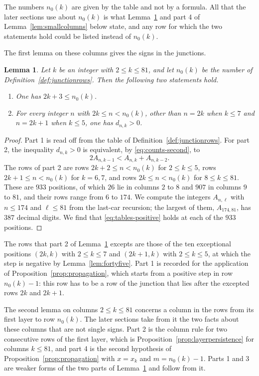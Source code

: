 \documentclass{amsart}
\newtheorem{lemma}[theorem]{Lemma}
\theoremstyle{definition}
\theoremstyle{remark}
\numberwithin{equation}{section}
\begin{document}
The numbers $n_0(k)$ are given by the table and not by a formula. All that
the later sections use about $n_0(k)$ is what Lemma~\ref{lem:junction} and
part 4 of Lemma~\ref{lem:smallcolumns} below state, and
any row for which the two statements hold could be listed instead of
$n_0(k)$.

The first lemma on these columns gives the signs in the junctions.

\begin{lemma}\label{lem:junction}
Let $k$ be an integer with $2\le k\le81$, and let $n_0(k)$ be the number of
Definition~\ref{def:junctionrows}. Then the following two statements hold.
\begin{enumerate}
\item One has $2k+3\le n_0(k)$.
\item For every integer $n$ with $2k\le n<n_0(k)$, other than $n=2k$ when
$k\le7$ and $n=2k+1$ when $k\le5$, one has $d_{n,k}>0$.
\end{enumerate}
\end{lemma}

\begin{proof}
Part 1 is read off from the table of Definition~\ref{def:junctionrows}. For
part 2, the inequality $d_{n,k}>0$ is equivalent, by
\eqref{eq:counts-second}, to
\begin{equation}\label{eq:tables-positive}
2A_{n,k-1}<A_{n,k}+A_{n,k-2}.
\end{equation}
The rows of part 2 are rows $2k+2\le n<n_0(k)$ for $2\le k\le5$, rows $2k+1\le
n<n_0(k)$ for $k=6,7$, and rows $2k\le n<n_0(k)$ for
$8\le k\le81$. These are $933$ positions, of which $26$ lie in columns
$2$ to $8$ and $907$ in columns $9$ to $81$, and their rows range from
$6$ to $174$. We compute the integers $A_{n,\ell}$ with $n\le174$ and
$\ell\le81$ from the last-car recursion; the largest of them,
$A_{174,81}$, has $387$ decimal digits. We find that
\eqref{eq:tables-positive} holds at each of the $933$ positions.
\end{proof}

The rows that part 2 of Lemma~\ref{lem:junction} excepts are those of the
ten exceptional positions
$(2k,k)$ with $2\le k\le7$ and $(2k+1,k)$ with $2\le k\le5$, at which the
step is negative by Lemma~\ref{lem:fortyfive}. Part 1 is recorded for the
application of Proposition~\ref{prop:propagation}, which starts from a
positive step in row $n_0(k)-1$: this row has to be a row of the junction
that lies after the excepted rows $2k$ and $2k+1$.

The second lemma on columns $2\le k\le81$ concerns a column in the rows
from its first layer to row $n_0(k)$. The later sections take from it the
two facts about these columns that are not single signs. Part 2 is the
column rule for two consecutive rows of the first layer, which is
Proposition~\ref{prop:layerpersistence} for columns $k\le81$, and part 4 is
the second hypothesis of Proposition~\ref{prop:propagation} with $x=x_k$
and $m=n_0(k)-1$. Parts 1 and 3 are weaker forms of the two parts of
Lemma~\ref{lem:junction} and follow from it.
\end{document}
